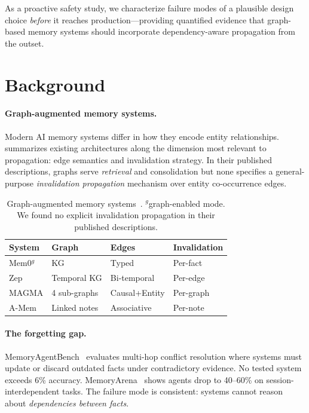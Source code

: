 \documentclass{article}
\begin{document}
\noindent As a proactive safety study, we characterize failure modes of a plausible design choice \textit{before} it reaches production---providing quantified evidence that graph-based memory systems should incorporate dependency-aware propagation from the outset.


\section{Background}
\label{sec:background}

\paragraph{Graph-augmented memory systems.}
Modern AI memory systems differ in how they encode entity relationships.
 summarizes existing architectures along the dimension most relevant to propagation: edge semantics and invalidation strategy.
In their published descriptions, graphs serve \textit{retrieval} and consolidation but none specifies a general-purpose \textit{invalidation propagation} mechanism over entity co-occurrence edges.

\begin{table}[htbp]
\centering
\footnotesize
\begin{tabular}{llll}
\toprule
\textbf{System} & \textbf{Graph} & \textbf{Edges} & \textbf{Invalidation} \\
\midrule
Mem0$^g$ & KG & Typed & Per-fact \\
Zep & Temporal KG & Bi-temporal & Per-edge \\
MAGMA & 4 sub-graphs & Causal+Entity & Per-graph \\
A-Mem & Linked notes & Associative & Per-note \\
\bottomrule
\end{tabular}
\caption{Graph-augmented memory systems~\citep{mem0_2024, zep_2025, magma_2026, amem_2025}. $^g$graph-enabled mode. We found no explicit invalidation propagation in their published descriptions.}
\label{tab:systems}
\end{table}

\paragraph{The forgetting gap.}
MemoryAgentBench~\citep{memoryagentbench_2026} evaluates multi-hop conflict resolution where systems must update or discard outdated facts under contradictory evidence.
No tested system exceeds 6\% accuracy.
MemoryArena~\citep{memoryarena_2026} shows agents drop to 40--60\% on session-interdependent tasks.
The failure mode is consistent: systems cannot reason about \textit{dependencies between facts}.
\end{document}
